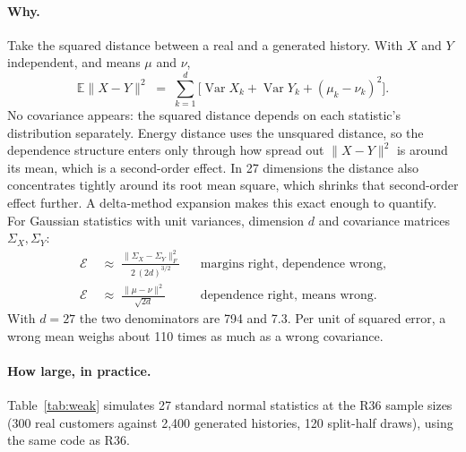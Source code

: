 \documentclass[11pt]{article}
\newcommand{\E}{\mathbb{E}}
\newcommand{\norm}[1]{\lVert #1 \rVert}
\begin{document}
\paragraph{Why.} Take the squared distance between a real and a generated
history. With $X$ and $Y$ independent, and means $\mu$ and $\nu$,
\begin{equation}
\E\norm{X - Y}^2 \;=\; \sum_{k=1}^{d}\Big[\operatorname{Var}X_k +
\operatorname{Var}Y_k + (\mu_k - \nu_k)^2\Big].
\end{equation}
No covariance appears: the squared distance depends on each statistic's
distribution separately. Energy distance uses the unsquared distance, so the
dependence structure enters only through how spread out $\norm{X-Y}^2$ is
around its mean, which is a second-order effect. In 27 dimensions the distance
also concentrates tightly around its root mean square, which shrinks that
second-order effect further. A delta-method expansion makes this exact enough to
quantify. For Gaussian statistics with unit variances, dimension $d$ and
covariance matrices $\Sigma_X, \Sigma_Y$:
\begin{align}
\mathcal{E} &\;\approx\; \frac{\norm{\Sigma_X - \Sigma_Y}_F^2}{2\,(2d)^{3/2}}
&&\text{margins right, dependence wrong,} \label{eq:weak}\\
\mathcal{E} &\;\approx\; \frac{\norm{\mu - \nu}^2}{\sqrt{2d}}
&&\text{dependence right, means wrong.} \nonumber
\end{align}
With $d = 27$ the two denominators are 794 and 7.3. Per unit of squared error, a
wrong mean weighs about 110 times as much as a wrong covariance.

\paragraph{How large, in practice.} Table~\ref{tab:weak} simulates 27 standard
normal statistics at the R36 sample sizes (300 real customers against 2,400
generated histories, 120 split-half draws), using the same code as R36.
\end{document}
